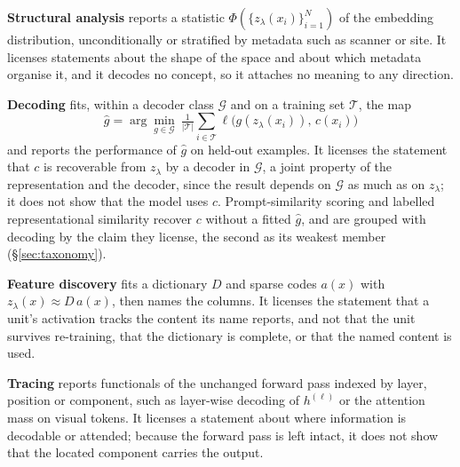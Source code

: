 \textbf{Structural analysis} reports a statistic $\Phi(\{z_\lambda(x_i)\}_{i=1}^{N})$ of the embedding
distribution, unconditionally or stratified by metadata such as scanner or site. It licenses statements
about the shape of the space and about which metadata organise it, and it decodes no concept, so it
attaches no meaning to any direction.

\textbf{Decoding} fits, within a decoder class $\mathcal{G}$ and on a training set $\mathcal{T}$, the map
\begin{equation}
\hat g=\arg\min_{g\in\mathcal G}\ \tfrac{1}{|\mathcal T|}\textstyle\sum_{i\in\mathcal T}\ell\big(g(z_\lambda(x_i)),\,c(x_i)\big)
\label{eq:probe}
\end{equation}
and reports the performance of $\hat g$ on held-out examples. It licenses the statement that $c$ is
recoverable from $z_\lambda$ by a decoder in $\mathcal{G}$, a joint property of the representation and
the decoder, since the result depends on $\mathcal G$ as much as on $z_\lambda$; it does not show that
the model uses $c$. Prompt-similarity scoring and labelled representational similarity recover $c$
without a fitted $\hat g$, and are grouped with decoding by the claim they license, the second as its
weakest member (\S\ref{sec:taxonomy}).

\textbf{Feature discovery} fits a dictionary $D$ and sparse codes $a(x)$ with
$z_\lambda(x)\approx D\,a(x)$, then names the columns. It licenses the statement that a unit's
activation tracks the content its name reports, and not that the unit survives re-training, that the
dictionary is complete, or that the named content is used.

\textbf{Tracing} reports functionals of the unchanged forward pass indexed by layer, position or
component, such as layer-wise decoding of $h^{(\ell)}$ or the attention mass on visual tokens. It
licenses a statement about where information is decodable or attended; because the forward pass is left
intact, it does not show that the located component carries the output.

